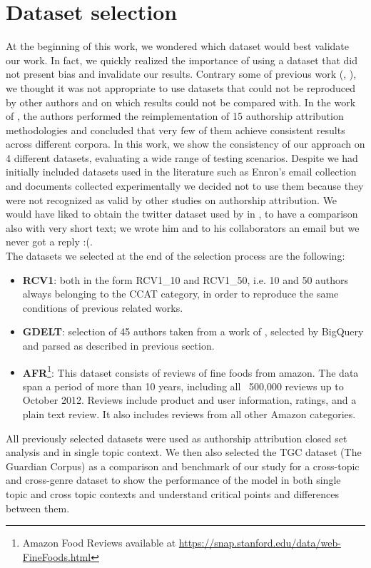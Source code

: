 \section{Dataset selection}

At the beginning of this work, we wondered which dataset would best validate our work. In fact, we quickly realized the importance of using a dataset that did not present bias and invalidate our results. Contrary some of previous work (\cite{diederich2003authorship}, \cite{koppel2003exploiting}), we thought it was not appropriate to use datasets that could not be reproduced by other authors and on which results could not be compared with.
In the work of \citeauthor{potthast2016wrote} \cite{potthast2016wrote},
the authors performed the reimplementation of 15 authorship attribution methodologies and concluded that very few of them achieve consistent results across different corpora. In
this work, we show the consistency of our approach on 4 different datasets, evaluating a wide range of testing scenarios.\cite{posadas2017application}
Despite we had initially included datasets used in the literature such as Enron's email collection and documents collected experimentally we decided not to use them because they were not recognized as valid by other studies on authorship attribution.
We would have liked to obtain the twitter dataset used by \citeauthor{layton2010authorship} in \cite{layton2010authorship}, to have a comparison also with very short text; we wrote him and to his collaborators an email but we never got a reply :(.\\
The datasets we selected at the end of the selection process are the following:
\begin{itemize}
\item \textbf{RCV1}: both in the form RCV1\_10 and RCV1\_50, i.e. 10 and 50 authors always belonging to the CCAT category, in order to reproduce the same conditions of previous related works.
\item \textbf{GDELT}: selection of 45 authors taken from a work of \cite{gungor2018benchmarking}, selected by BigQuery and parsed as described in previous section.
\item \textbf{AFR}\footnote{Amazon Food Reviews available at \url{https://snap.stanford.edu/data/web-FineFoods.html}}: This dataset consists of reviews of fine foods from amazon. The data span a period of more than 10 years, including all ~500,000 reviews up to October 2012. Reviews include product and user information, ratings, and a plain text review. It also includes reviews from all other Amazon categories.
\end{itemize}
All previously selected datasets were used as authorship attribution closed set analysis and in single topic context.
We then also selected the TGC dataset (The Guardian Corpus) as a comparison and benchmark of our study for a cross-topic and cross-genre dataset to show the performance of the model in both single topic and cross topic contexts and understand critical points and differences between them.